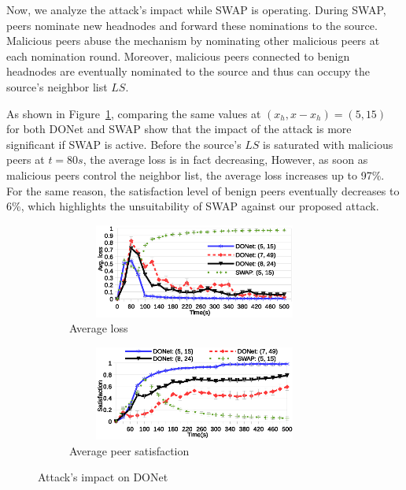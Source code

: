 Now, we analyze the attack's impact while SWAP is operating.
During SWAP, peers nominate new headnodes and forward these nominations to the source. 
Malicious peers abuse the mechanism by nominating other malicious peers at each nomination round. 
Moreover, malicious peers connected to benign headnodes are eventually nominated to the source and thus can occupy the source's neighbor list $LS$. 

As shown in Figure~\ref{subfig:avg-loss-donet}, comparing the same values at $(x_h, x-x_h)=(5, 15)$ for both DONet and SWAP show that the impact of the attack is more significant if SWAP is active.
Before the source's $LS$ is saturated with malicious peers at $t=80s$, the average loss is in fact decreasing, However, as soon as malicious peers control the neighbor list, the average loss increases up to 97\%. 
For the same reason, the satisfaction level of benign peers eventually decreases to 6\%, which highlights the unsuitability of SWAP against our proposed attack.




\begin{figure}[tb]
  \centering
  \begin{subfigure}[c]{0.95\columnwidth}
    \centering
    \includegraphics[width=8.4cm,height=3.1cm]{./Figures/avg-loss-donet.eps}
    \caption{Average loss}%
    \label{subfig:avg-loss-donet}
  \end{subfigure}
  \begin{subfigure}[c]{0.95\columnwidth}
    \centering
    \includegraphics[width=8.4cm,height=3.1cm]{./Figures/satisfaction-donet.eps}
    \caption{Average peer satisfaction}%
    \label{subfig:satisfaction-donet}
  \end{subfigure}
  \caption{Attack's impact on DONet}%
  \label{fig:attack-results}
  \vspace{-4mm}
\end{figure}

